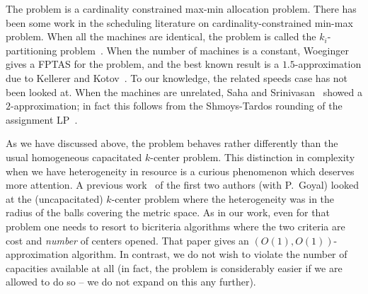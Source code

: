 The \cckp problem is a cardinality constrained max-min allocation problem. There has been some work in the scheduling literature on cardinality-constrained min-max problem.
When all the machines are identical, the problem is called the $k_i$-partitioning problem~\cite{BabelKK98}.
When the number of machines is a constant, Woeginger~\cite{Woe05} gives a FPTAS for the problem, and the best known result is a $1.5$-approximation due to Kellerer and Kotov~\cite{KellererK11}.
To our knowledge, the related speeds case has not been looked at. When the machines are unrelated,  Saha and Srinivasan~\cite{SahaS10} showed a $2$-approximation; in fact this follows from the Shmoys-Tardos rounding of the assignment LP~\cite{ShmoysT93}.\smallskip

As we have discussed above, the \mckc problem behaves rather differently than the usual homogeneous capacitated $k$-center problem. This distinction in complexity when we have heterogeneity  in resource is a curious phenomenon which deserves more attention.
A previous work~\cite{ChakrabartyGK16} of the first two authors (with P.~Goyal) looked at the (uncapacitated) $k$-center problem where the heterogeneity was in the radius of the balls covering the metric space.
As in our work, even for that problem one needs to resort to bicriteria algorithms where the two criteria are cost and {\em number} of centers opened. That paper gives an $\left(O(1),O(1)\right)$-approximation algorithm.
In contrast, we do not wish to violate the number of capacities available at all (in fact, the problem is considerably easier if we are allowed to do so -- we do not expand on this any further).





